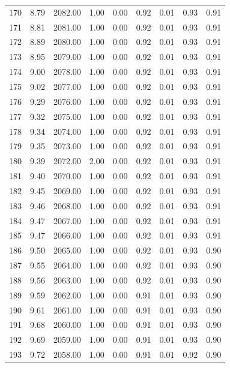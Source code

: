 \documentclass{article}\usepackage[]{graphicx}\usepackage[]{color}
\begin{document}
\begin{longtable}{rrrrrrrrr}
  170 & 8.79 & 2082.00 & 1.00 & 0.00 & 0.92 & 0.01 & 0.93 & 0.91 \\ 
  171 & 8.81 & 2081.00 & 1.00 & 0.00 & 0.92 & 0.01 & 0.93 & 0.91 \\ 
  172 & 8.89 & 2080.00 & 1.00 & 0.00 & 0.92 & 0.01 & 0.93 & 0.91 \\ 
  173 & 8.95 & 2079.00 & 1.00 & 0.00 & 0.92 & 0.01 & 0.93 & 0.91 \\ 
  174 & 9.00 & 2078.00 & 1.00 & 0.00 & 0.92 & 0.01 & 0.93 & 0.91 \\ 
  175 & 9.02 & 2077.00 & 1.00 & 0.00 & 0.92 & 0.01 & 0.93 & 0.91 \\ 
  176 & 9.29 & 2076.00 & 1.00 & 0.00 & 0.92 & 0.01 & 0.93 & 0.91 \\ 
  177 & 9.32 & 2075.00 & 1.00 & 0.00 & 0.92 & 0.01 & 0.93 & 0.91 \\ 
  178 & 9.34 & 2074.00 & 1.00 & 0.00 & 0.92 & 0.01 & 0.93 & 0.91 \\ 
  179 & 9.35 & 2073.00 & 1.00 & 0.00 & 0.92 & 0.01 & 0.93 & 0.91 \\ 
  180 & 9.39 & 2072.00 & 2.00 & 0.00 & 0.92 & 0.01 & 0.93 & 0.91 \\ 
  181 & 9.40 & 2070.00 & 1.00 & 0.00 & 0.92 & 0.01 & 0.93 & 0.91 \\ 
  182 & 9.45 & 2069.00 & 1.00 & 0.00 & 0.92 & 0.01 & 0.93 & 0.91 \\ 
  183 & 9.46 & 2068.00 & 1.00 & 0.00 & 0.92 & 0.01 & 0.93 & 0.91 \\ 
  184 & 9.47 & 2067.00 & 1.00 & 0.00 & 0.92 & 0.01 & 0.93 & 0.91 \\ 
  185 & 9.47 & 2066.00 & 1.00 & 0.00 & 0.92 & 0.01 & 0.93 & 0.91 \\ 
  186 & 9.50 & 2065.00 & 1.00 & 0.00 & 0.92 & 0.01 & 0.93 & 0.90 \\ 
  187 & 9.55 & 2064.00 & 1.00 & 0.00 & 0.92 & 0.01 & 0.93 & 0.90 \\ 
  188 & 9.56 & 2063.00 & 1.00 & 0.00 & 0.92 & 0.01 & 0.93 & 0.90 \\ 
  189 & 9.59 & 2062.00 & 1.00 & 0.00 & 0.91 & 0.01 & 0.93 & 0.90 \\ 
  190 & 9.61 & 2061.00 & 1.00 & 0.00 & 0.91 & 0.01 & 0.93 & 0.90 \\ 
  191 & 9.68 & 2060.00 & 1.00 & 0.00 & 0.91 & 0.01 & 0.93 & 0.90 \\ 
  192 & 9.69 & 2059.00 & 1.00 & 0.00 & 0.91 & 0.01 & 0.93 & 0.90 \\ 
  193 & 9.72 & 2058.00 & 1.00 & 0.00 & 0.91 & 0.01 & 0.92 & 0.90 \\ 

\end{longtable}
\end{document}
